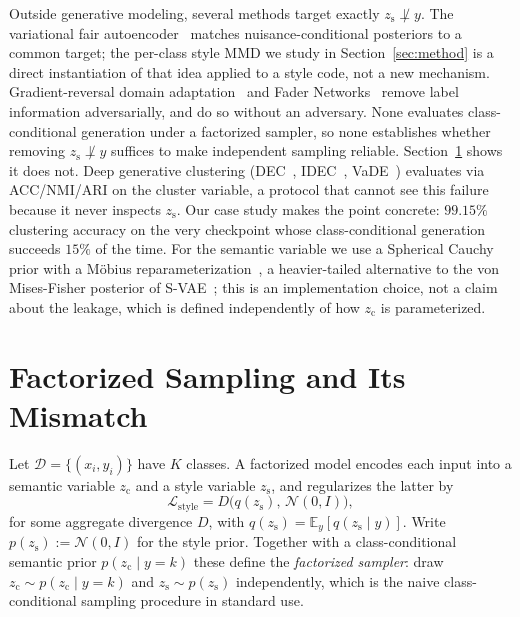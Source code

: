 \documentclass[letterpaper]{article} %
\newcommand{\zc}{z_{\mathrm{c}}}
\newcommand{\zs}{z_{\mathrm{s}}}
\begin{document}
Outside generative modeling, several methods target exactly $\zs\not\perp y$.
The variational fair autoencoder~\citep{louizos2015variational} matches
nuisance-conditional posteriors to a common target; the per-class style MMD
we study in Section~\ref{sec:method} is a direct instantiation of that idea
applied to a style code, not a new mechanism. Gradient-reversal domain
adaptation~\citep{ganin2015unsupervised} and Fader
Networks~\citep{lample2017fader} remove label information adversarially, and
\citet{moyer2018invariant} do so without an adversary. None evaluates
class-conditional generation under a factorized sampler, so none establishes
whether removing $\zs\not\perp y$ suffices to make independent sampling
reliable. Section~\ref{sec:theory} shows it does not. Deep generative
clustering (DEC~\citep{xie2015unsupervised},
IDEC~\citep{guo2017improved}, VaDE~\citep{jiang2016variational}) evaluates
via ACC/NMI/ARI on the cluster variable, a protocol that cannot see this
failure because it never inspects $\zs$. Our case study makes the point
concrete: $99.15\%$ clustering accuracy on the very checkpoint whose
class-conditional generation succeeds $15\%$ of the time. For the semantic
variable we use a Spherical Cauchy prior with a M\"obius
reparameterization~\citep{sablica2025hyperspherical}, a heavier-tailed
alternative to the von Mises-Fisher posterior of
S-VAE~\citep{davidson2018hyperspherical}; this is an implementation choice,
not a claim about the leakage, which is defined independently of how $\zc$ is
parameterized.

\section{Factorized Sampling and Its Mismatch}
\label{sec:theory}

Let $\mathcal D=\{(x_i,y_i)\}$ have $K$ classes. A factorized model encodes
each input into a semantic variable $\zc$ and a style variable $\zs$, and
regularizes the latter by
\begin{equation}
\mathcal L_{\mathrm{style}} = D\bigl(q(\zs),\,\mathcal N(0,I)\bigr),
\label{eq:style}
\end{equation}
for some aggregate divergence $D$, with $q(\zs)=\mathbb E_y[q(\zs\mid y)]$.
Write $p(\zs):=\mathcal N(0,I)$ for the style prior. Together with a
class-conditional semantic prior $p(\zc\mid y{=}k)$ these define the
\emph{factorized sampler}: draw $\zc\sim p(\zc\mid y{=}k)$ and $\zs\sim
p(\zs)$ independently, which is the naive class-conditional sampling
procedure in standard use.
\end{document}
